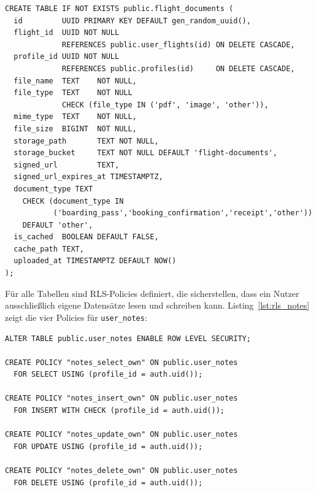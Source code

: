 \begin{lstlisting}[style=skyline-sql,
  caption={Foreign Key mit ON DELETE CASCADE in \texttt{flight\_documents}
           (migration\_add\_flight\_documents.sql)},
  label={lst:fk_cascade}]
CREATE TABLE IF NOT EXISTS public.flight_documents (
  id         UUID PRIMARY KEY DEFAULT gen_random_uuid(),
  flight_id  UUID NOT NULL
             REFERENCES public.user_flights(id) ON DELETE CASCADE,
  profile_id UUID NOT NULL
             REFERENCES public.profiles(id)     ON DELETE CASCADE,
  file_name  TEXT    NOT NULL,
  file_type  TEXT    NOT NULL
             CHECK (file_type IN ('pdf', 'image', 'other')),
  mime_type  TEXT    NOT NULL,
  file_size  BIGINT  NOT NULL,
  storage_path       TEXT NOT NULL,
  storage_bucket     TEXT NOT NULL DEFAULT 'flight-documents',
  signed_url         TEXT,
  signed_url_expires_at TIMESTAMPTZ,
  document_type TEXT
    CHECK (document_type IN
           ('boarding_pass','booking_confirmation','receipt','other'))
    DEFAULT 'other',
  is_cached  BOOLEAN DEFAULT FALSE,
  cache_path TEXT,
  uploaded_at TIMESTAMPTZ DEFAULT NOW()
);
\end{lstlisting}

Für alle Tabellen sind RLS-Policies definiert, die sicherstellen, dass ein Nutzer
ausschließlich eigene Datensätze lesen und schreiben kann.
Listing~\ref{lst:rls_notes} zeigt die vier Policies für \texttt{user\_notes}:

\begin{lstlisting}[style=skyline-sql,
  caption={Row-Level-Security-Policies für \texttt{user\_notes}
           (complete\_working\_schema.sql)},
  label={lst:rls_notes}]
ALTER TABLE public.user_notes ENABLE ROW LEVEL SECURITY;

CREATE POLICY "notes_select_own" ON public.user_notes
  FOR SELECT USING (profile_id = auth.uid());

CREATE POLICY "notes_insert_own" ON public.user_notes
  FOR INSERT WITH CHECK (profile_id = auth.uid());

CREATE POLICY "notes_update_own" ON public.user_notes
  FOR UPDATE USING (profile_id = auth.uid());

CREATE POLICY "notes_delete_own" ON public.user_notes
  FOR DELETE USING (profile_id = auth.uid());
\end{lstlisting}

